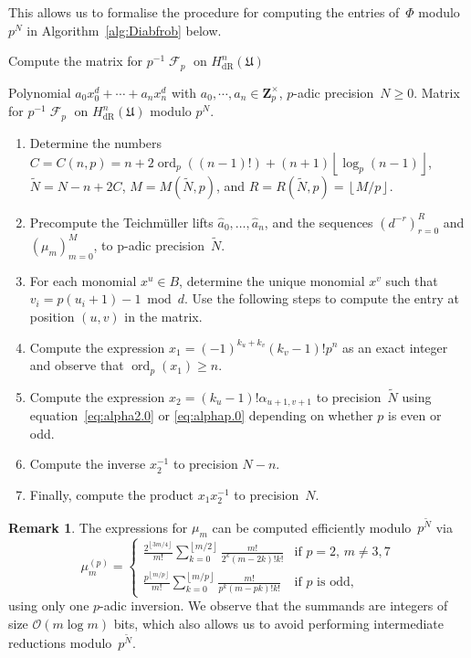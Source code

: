\documentclass[a4paper,11pt]{article}
\numberwithin{equation}{section}
\providecommand{\floor}[1]{\left\lfloor#1\right\rfloor}   %
\newcommand{\ZZ}{\mathbf{Z}} %
\DeclareMathOperator{\ord}{ord}          %
\DeclareMathOperator{\Frob}{\mathcal{F}} %
\providecommand{\HdR}{H_{\text{dR}}}    %
\providecommand{\BigOh}{\mathcal{O}} %
\theoremstyle{definition}
\newtheorem{rem}[thm]{Remark}
\begin{document}
This allows us to formalise the procedure for computing the 
entries of~$\Phi$ modulo~$p^N$ in Algorithm~\ref{alg:Diabfrob} 
below.

\begin{algorithm}
\caption{Compute the matrix for $p^{-1} \Frob_p$ on $\HdR^n(\mathfrak{U})$}
\label{alg:Diabfrob}
\begin{algorithmic}
\vspace{1mm}
\Require Polynomial $a_0 x_0^d + \dotsb + a_n x_n^d$ with $a_0,\cdots,a_n \in \ZZ_p^{\times}$, $p$-adic precision~$N \geq 0$.
\Ensure  Matrix for $p^{-1} \Frob_p$ on $\HdR^n(\mathfrak{U})$ modulo $p^N$.
\begin{enumerate}
\item Determine the numbers 
      $C = C(n,p) = n + 2 \ord_p((n-1)!) + (n+1) \floor{\log_p(n-1)}$, 
      $\tilde{N} = N - n + 2 C$, $M = M(\tilde{N}, p)$, and 
      $R = R(\tilde{N}, p) = \floor{M/p}$.
\item Precompute the Teichm\"uller lifts $\hat{a}_0, \dotsc, \hat{a}_n$, 
      and the sequences $(d^{-r})_{r=0}^R$ and $(\mu_m)_{m=0}^{M}$, 
      to p-adic precision~$\tilde{N}$.
\item For each monomial $x^u \in B$, 
      determine the unique monomial $x^v$ such that 
      $v_i = p (u_i + 1) - 1 \bmod{d}$.  Use the following steps to 
      compute the entry at position $(u,v)$ in the matrix.
\item Compute the expression $x_1 = (-1)^{k_u+k_v} (k_v-1)! p^n$ as an 
      exact integer and observe that \mbox{$\ord_p(x_1) \geq n$}.
\item Compute the expression $x_2 = (k_u - 1)! \alpha_{u+1,v+1}$ to 
      precision~$\tilde{N}$ using equation~\eqref{eq:alpha2.0} or 
      \eqref{eq:alphap.0} depending on whether $p$ is even or odd. 
\item Compute the inverse $x_2^{-1}$ to precision $N - n$.
\item Finally, compute the product $x_1 x_2^{-1}$ to precision~$N$.
\end{enumerate}
\EndProcedure
\end{algorithmic}
\end{algorithm}

\begin{rem} \label{rem:mup}
The expressions for $\mu_m$ can be computed efficiently 
modulo~$p^{\tilde{N}}$ via 
\begin{equation}
\mu_m^{(p)} = \begin{cases}
\frac{2^{\floor{3m/4}}}{m!} 
    \sum_{k=0}^{\floor{m/2}} \frac{m!}{2^k (m-2k)! k!}
    & \text{if $p = 2$, $m \neq 3, 7$} \\
\frac{p^{\floor{m/p}}}{m!} 
    \sum_{k=0}^{\floor{m/p}} \frac{m!}{p^k (m-pk)! k!}
    & \text{if $p$ is odd},
\end{cases}
\end{equation}
using only one $p$-adic inversion.  We observe that the summands are 
integers of size $\BigOh(m \log m)$ bits, which also allows us to 
avoid performing intermediate reductions modulo~$p^{\tilde{N}}$.
\end{rem}
\end{document}
